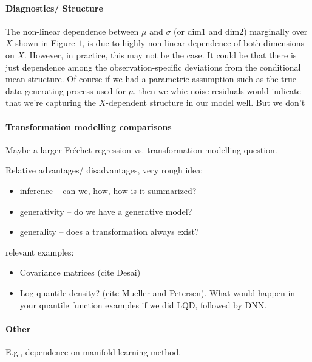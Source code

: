 \paragraph*{Diagnostics/ Structure}

The non-linear dependence between $\mu$ and $\sigma$ (or dim1 and dim2) marginally over $X$ shown in Figure $1$, is due to highly non-linear dependence of both dimensions on $X$.
However, in practice, this may not be the case.
It could be that there is just dependence among the observation-specific deviations from the conditional mean structure.
Of course if we had a parametric assumption such as the true data generating process used for $\mu$, then we whie noise residuals would indicate that we're capturing the $X$-dependent structure in our model well. But we don't

\paragraph*{Transformation modelling comparisons}

Maybe a larger Fr\'echet regression vs. transformation modelling question.

Relative advantages/ disadvantages, very rough idea:

\begin{itemize}
  \item inference -- can we, how, how is it summarized?
  \item generativity -- do we have a generative model?
  \item generality -- does a transformation always exist?
\end{itemize}


relevant examples:
\begin{itemize}
  \item Covariance matrices (cite Desai)
  \item Log-quantile density? (cite Mueller and Petersen). What would happen in your quantile function examples if we did LQD, followed by DNN.
\end{itemize}

\paragraph*{Other}

E.g., dependence on manifold learning method.
